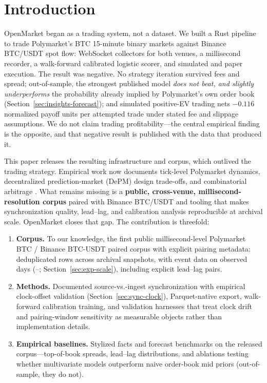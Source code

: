 \section{Introduction}
\label{sec:introduction}

OpenMarket began as a trading system, not a dataset. We built a Rust
pipeline to trade Polymarket's BTC 15-minute binary markets against Binance
BTC/USDT spot flow: WebSocket collectors for both venues, a millisecond
recorder, a walk-forward calibrated logistic scorer, and simulated and paper
execution. The result was negative. No strategy iteration survived fees and
spread; out-of-sample, the strongest published model \emph{does not beat, and
slightly underperforms} the probability already implied by Polymarket's own
order book (Section~\ref{sec:insights-forecast}); and simulated positive-EV
trading nets $-0.116$ normalized payoff units per attempted trade under stated
fee and slippage assumptions. We do not claim trading profitability---the
central empirical finding is the opposite, and that negative result is
published with the data that produced it.

This paper releases the resulting infrastructure and corpus, which outlived
the trading strategy. Empirical work now documents tick-level
Polymarket dynamics, decentralized prediction-market (DePM) design
trade-offs, and combinatorial arbitrage
\cite{dubach2026anatomy,saguillo2025arbitrage,rahman2025sok}. What remains
missing is a \textbf{public, cross-venue, millisecond-resolution corpus}
paired with Binance BTC/USDT and tooling that makes synchronization
quality, lead--lag, and calibration analysis reproducible at archival
scale. OpenMarket closes that gap. The contribution is threefold:
\begin{enumerate}
  \item \textbf{Corpus.} To our knowledge, the first public millisecond-level
        Polymarket BTC / Binance BTC-USDT paired corpus with explicit pairing
        metadata: \OpenMarketTotalRows{} deduplicated rows across
        \OpenMarketSnapshots{} archival snapshots, with event data on
        \OpenMarketPolyObservedDays{} observed days
        (\OpenMarketDataFirstDay{}--\OpenMarketDataLastDay{};
        Section~\ref{sec:exp-scale}), including
        \OpenMarketLagPairs{} explicit lead--lag pairs.
  \item \textbf{Methods.} Documented source-vs.-ingest synchronization
        with empirical clock-offset validation
        (Section~\ref{sec:sync-clock}), Parquet-native export,
        walk-forward calibration training, and validation harnesses that
        treat clock drift and pairing-window sensitivity as measurable
        objects rather than implementation details.
  \item \textbf{Empirical baselines.} Stylized facts and forecast
        benchmarks on the released corpus---top-of-book spreads, lead--lag
        distributions, and ablations testing whether multivariate models
        outperform naive order-book mid priors (out-of-sample, they do
        not).
\end{enumerate}

